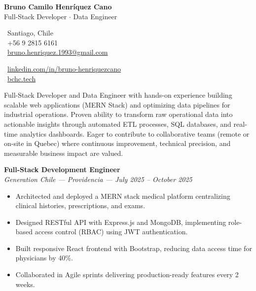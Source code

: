 \documentclass[10pt,letterpaper]{article}
\begin{document}
\begin{center}
    {\Huge \textbf{Bruno Camilo Henríquez Cano}} \\[0.2cm]
    {\Large Full-Stack Developer $\cdot$ Data Engineer}
\end{center}

\vspace{0.3cm}

\noindent
\begin{minipage}[t]{0.5\textwidth}
    \faMapMarker\ Santiago, Chile \\
    \faPhone\ +56 9 2815 6161 \\
    \faEnvelope\ \href{mailto:bruno.henriquez.1993@gmail.com}{bruno.henriquez.1993@gmail.com}
\end{minipage}
\begin{minipage}[t]{0.5\textwidth}
    \faLinkedin\ \href{https://linkedin.com/in/bruno-henriquezcano}{linkedin.com/in/bruno-henriquezcano} \\
    \faGlobe\ \href{https://bchc.tech}{bchc.tech}
\end{minipage}

\vspace{0.4cm}


\vspace{0.2cm}

\noindent Full-Stack Developer and Data Engineer with hands-on experience building scalable web applications (MERN Stack) and optimizing data pipelines for industrial operations. Proven ability to transform raw operational data into actionable insights through automated ETL processes, SQL databases, and real-time analytics dashboards. Eager to contribute to collaborative teams (remote or on-site in Quebec) where continuous improvement, technical precision, and measurable business impact are valued.

\vspace{0.4cm}


\vspace{0.3cm}

\noindent \textbf{Full-Stack Development Engineer} \\
\textit{Generation Chile — Providencia — July 2025 – October 2025}
\begin{itemize}
    \item Architected and deployed a MERN stack medical platform centralizing clinical histories, prescriptions, and exams.
    \item Designed RESTful API with Express.js and MongoDB, implementing role-based access control (RBAC) using JWT authentication.
    \item Built responsive React frontend with Bootstrap, reducing data access time for physicians by 40\%.
    \item Collaborated in Agile sprints delivering production-ready features every 2 weeks.
\end{itemize}
\end{document}
